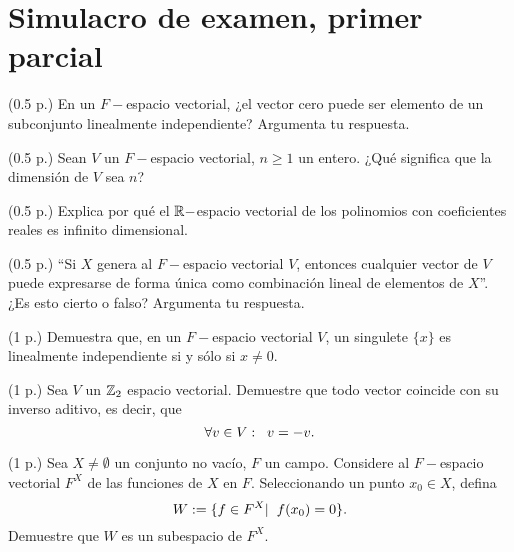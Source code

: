 \section{Simulacro de examen, primer parcial}

\begin{prob}
(0.5 p.)
En un $F-$espacio vectorial, ¿el vector cero
puede ser elemento de un subconjunto
linealmente independiente?
Argumenta tu respuesta.
\end{prob}

\begin{prob}
(0.5 p.) Sean $V$ un $F-$espacio
vectorial, $n \geq 1$ un entero. ¿Qué significa
que la dimensión de $V$ sea $n$?
\end{prob}

\begin{prob}
(0.5 p.)
Explica por qué el $\mathbb{R}-$espacio vectorial de los
polinomios con coeficientes reales
es infinito dimensional.
\end{prob}

\begin{prob}
(0.5 p.) ``Si $X$ genera 
al $F-$espacio vectorial $V$, entonces cualquier vector de $V$
puede expresarse de forma única como combinación lineal
de elementos de $X$''.
¿Es esto cierto o falso?
Argumenta tu respuesta.
\end{prob}

\begin{prob}
(1 p.) Demuestra que, en 
un $F-$espacio vectorial $V$, un singulete
$\{ x \}$ es linealmente
independiente si y sólo
si $x \neq 0$.
\end{prob}

\begin{prob}
(1 p.) Sea $V$
un $\mathbb{Z}_{2}$ espacio vectorial. Demuestre que
todo vector coincide con su inverso aditivo,
es decir, que
\[
\forall v \in V: \hspace{0.2cm}
v = -v.
\]
\end{prob}

\begin{prob}
(1 p.)
Sea $X \neq \emptyset$ un conjunto no vacío,
$F$ un campo. Considere al $F-$espacio
vectorial $F^{X}$ de las funciones de 
$X$ en $F$. Seleccionando un punto
$x_{0} \in X$, defina
\[
W:= \{ f \in F^{X}  | \hspace{0.2cm} 
f(x_{0}) = 0 \}.
\]
Demuestre que $W$ es un subespacio de
$F^{X}$.
\end{prob}

